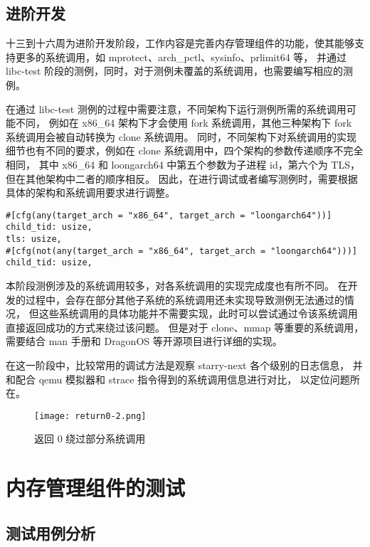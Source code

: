 \subsection{进阶开发}

十三到十六周为进阶开发阶段，工作内容是完善内存管理组件的功能，使其能够支持更多的系统调用，如 mprotect、arch\_pctl、sysinfo、prlimit64 等，
并通过 libc-test 阶段的测例，同时，对于测例未覆盖的系统调用，也需要编写相应的测例。

在通过 libc-test 测例的过程中需要注意，不同架构下运行测例所需的系统调用可能不同，
例如在 x86\_64 架构下才会使用 fork 系统调用，其他三种架构下 fork 系统调用会被自动转换为 clone 系统调用。
同时，不同架构下对系统调用的实现细节也有不同的要求，例如在 clone 系统调用中，四个架构的参数传递顺序不完全相同，
其中 x86\_64 和 loongarch64 中第五个参数为子进程 id，第六个为 TLS，但在其他架构中二者的顺序相反。
因此，在进行调试或者编写测例时，需要根据具体的架构和系统调用要求进行调整。

\begin{lstlisting}[caption=不同架构下 clone 的部分参数传递顺序]
#[cfg(any(target_arch = "x86_64", target_arch = "loongarch64"))] child_tid: usize,
tls: usize,
#[cfg(not(any(target_arch = "x86_64", target_arch = "loongarch64")))] child_tid: usize,
\end{lstlisting}

本阶段测例涉及的系统调用较多，对各系统调用的实现完成度也有所不同。
在开发的过程中，会存在部分其他子系统的系统调用还未实现导致测例无法通过的情况，
但这些系统调用的具体功能并不需要实现，此时可以尝试通过令该系统调用直接返回成功的方式来绕过该问题。
但是对于 clone、mmap 等重要的系统调用，需要结合 man 手册和 DragonOS 等开源项目进行详细的实现。

在这一阶段中，比较常用的调试方法是观察 starry-next 各个级别的日志信息，
并和配合 qemu 模拟器和 strace 指令得到的系统调用信息进行对比，
以定位问题所在。

\begin{figure}
    \centering
    \texttt{[image: return0-2.png]}
    \caption{返回 0 绕过部分系统调用}
    \label{fig:return0}
\end{figure}

\section{内存管理组件的测试}

\subsection{测试用例分析}

